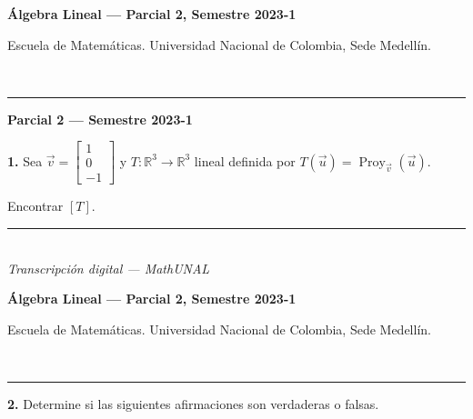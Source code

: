 \documentclass[11pt]{article}
\newcommand{\examheader}{%
  \noindent
  \begin{minipage}[t]{0.6\linewidth}
    {\small\bfseries Álgebra Lineal --- Parcial 2, Semestre 2023-1}\\
  \end{minipage}%
  \hfill
  \begin{minipage}[t]{0.35\linewidth}
    \raggedleft\small Escuela de Matemáticas. Universidad Nacional de Colombia, Sede Medellín.
  \end{minipage}\\[2pt]
  \rule{\linewidth}{0.6pt}
}
\newcommand{\examfooter}{%
  \vfill
  \rule{\linewidth}{0.4pt}\\[1pt]
  {\scriptsize\textit{Transcripción digital --- MathUNAL}\hfill\textcolor{unalblue}{\textbf{\thepage}}}
}
\begin{document}
\examheader

\begin{center}
{\bfseries\large Parcial 2 --- Semestre 2023-1}
\end{center}

\textbf{1.} Sea $\vec{v} = \begin{bmatrix}1\\0\\-1\end{bmatrix}$ y $T:\mathbb{R}^3 \to \mathbb{R}^3$ lineal definida por $T(\vec{u}) = \operatorname{Proy}_{\vec{v}}(\vec{u})$.

Encontrar $[T]$.

\vspace{2cm}

\examfooter
\newpage

\examheader

\textbf{2.} Determine si las siguientes afirmaciones son verdaderas o falsas.
\end{document}

